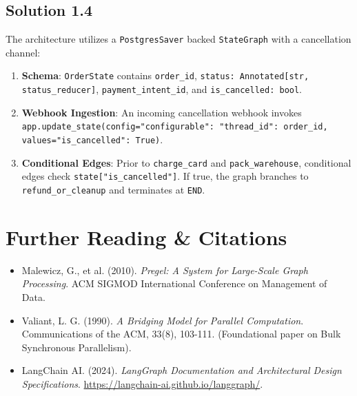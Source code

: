 \subsection*{Solution 1.4}
The architecture utilizes a \texttt{PostgresSaver} backed \texttt{StateGraph} with a cancellation channel:
\begin{enumerate}
  \item \textbf{Schema}: \texttt{OrderState} contains \texttt{order\_id}, \texttt{status: Annotated[str, status\_reducer]}, \texttt{payment\_intent\_id}, and \texttt{is\_cancelled: bool}.
  \item \textbf{Webhook Ingestion}: An incoming cancellation webhook invokes \texttt{app.update\_state(config={"configurable": {"thread\_id": order\_id}}, values={"is\_cancelled": True})}.
  \item \textbf{Conditional Edges}: Prior to \texttt{charge\_card} and \texttt{pack\_warehouse}, conditional edges check \texttt{state["is\_cancelled"]}. If true, the graph branches to \texttt{refund\_or\_cleanup} and terminates at \texttt{END}.
\end{enumerate}

\section{Further Reading \& Citations}
\begin{itemize}[leftmargin=18pt]
  \item Malewicz, G., et al. (2010). \emph{Pregel: A System for Large-Scale Graph Processing}. ACM SIGMOD International Conference on Management of Data.
  \item Valiant, L. G. (1990). \emph{A Bridging Model for Parallel Computation}. Communications of the ACM, 33(8), 103-111. (Foundational paper on Bulk Synchronous Parallelism).
  \item LangChain AI. (2024). \emph{LangGraph Documentation and Architectural Design Specifications}. \url{https://langchain-ai.github.io/langgraph/}.
\end{itemize}

